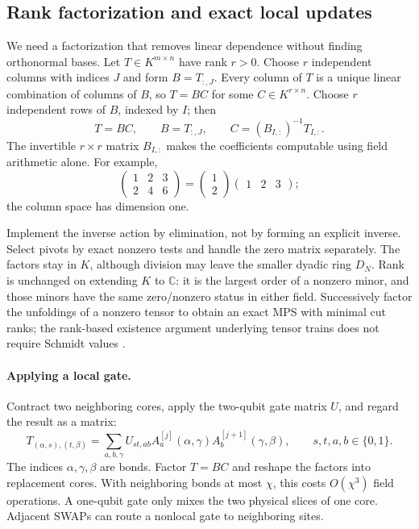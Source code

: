 \documentclass[11pt,a4paper]{article}
\newcommand{\C}{\mathbb{C}}
\begin{document}
\subsection{Rank factorization and exact local updates}
\label{sec:rank}
We need a factorization that removes linear dependence without finding
orthonormal bases. Let $T\in K^{m\times n}$ have rank $r>0$.
Choose $r$ independent columns with indices $J$ and form $B=T_{:,J}$.
Every column of $T$ is a unique linear combination of columns of $B$,
so $T=BC$ for some $C\in K^{r\times n}$.
Choose $r$ independent rows of $B$, indexed by $I$; then
\begin{equation}
T=BC,\qquad B=T_{:,J},\qquad C=(B_{I,:})^{-1}T_{I,:}.
\label{eq:rankfactor}
\end{equation}
The invertible $r\times r$ matrix $B_{I,:}$ makes the coefficients
computable using field arithmetic alone. For example,
\[
\begin{pmatrix}1&2&3\\2&4&6\end{pmatrix}
=\begin{pmatrix}1\\2\end{pmatrix}
 \begin{pmatrix}1&2&3\end{pmatrix};
\]
the column space has dimension one.

Implement the inverse action by elimination, not by forming an explicit
inverse. Select pivots by exact nonzero tests and handle the zero matrix
separately. The factors stay in $K$, although division may leave the
smaller dyadic ring $D_N$. Rank is unchanged on extending $K$ to $\C$:
it is the largest order of a nonzero minor, and those minors have the
same zero/nonzero status in either field.
Successively factor the unfoldings of a nonzero tensor to obtain an
exact MPS with minimal cut ranks; the rank-based existence argument
underlying tensor trains does not require Schmidt values \cite{oseledets}.

\paragraph{Applying a local gate.}
Contract two neighboring cores, apply the two-qubit gate matrix $U$,
and regard the result as a matrix:
\begin{equation}
T_{(\alpha,s),(t,\beta)}
=\sum_{a,b,\gamma}U_{st,ab}
 A^{[j]}_a(\alpha,\gamma)A^{[j+1]}_b(\gamma,\beta),
\qquad s,t,a,b\in\{0,1\}.
\label{eq:mpsupdate}
\end{equation}
The indices $\alpha,\gamma,\beta$ are bonds.
Factor $T=BC$ and reshape the factors into replacement cores.
With neighboring bonds at most $\chi$, this costs $O(\chi^3)$ field operations.
A one-qubit gate only mixes the two physical slices of one core.
Adjacent SWAPs can route a nonlocal gate to neighboring sites.
\end{document}
